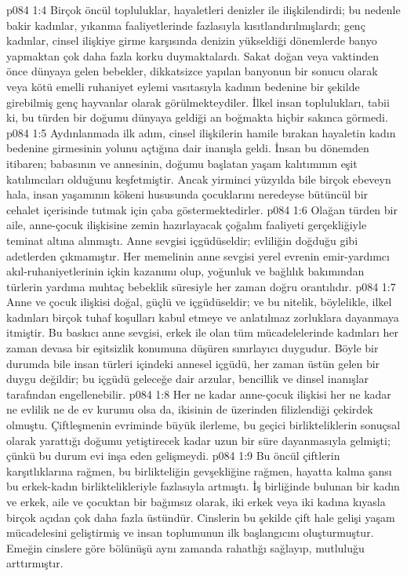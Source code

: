 \vs p084 1:4 Birçok öncül topluluklar, hayaletleri denizler ile ilişkilendirdi; bu nedenle bakir kadınlar, yıkanma faaliyetlerinde fazlasıyla kısıtlandırılmışlardı; genç kadınlar, cinsel ilişkiye girme karşısında denizin yükseldiği dönemlerde banyo yapmaktan çok daha fazla korku duymaktalardı. Sakat doğan veya vaktinden önce dünyaya gelen bebekler, dikkatsizce yapılan banyonun bir sonucu olarak veya kötü emelli ruhaniyet eylemi vasıtasıyla kadının bedenine bir şekilde girebilmiş genç hayvanlar olarak görülmekteydiler. İlkel insan toplulukları, tabii ki, bu türden bir doğumu dünyaya geldiği an boğmakta hiçbir sakınca görmedi.
\vs p084 1:5 Aydınlanmada ilk adım, cinsel ilişkilerin hamile bırakan hayaletin kadın bedenine girmesinin yolunu açtığına dair inanışla geldi. İnsan bu dönemden itibaren; babasının ve annesinin, doğumu başlatan yaşam kalıtımının eşit katılımcıları olduğunu keşfetmiştir. Ancak yirminci yüzyılda bile birçok ebeveyn hala, insan yaşamının kökeni hususunda çocuklarını neredeyse bütüncül bir cehalet içerisinde tutmak için çaba göstermektedirler.
\vs p084 1:6 Olağan türden bir aile, anne\hyp{}çocuk ilişkisine zemin hazırlayacak çoğalım faaliyeti gerçekliğiyle teminat altına alınmıştı. Anne sevgisi içgüdüseldir; evliliğin doğduğu gibi adetlerden çıkmamıştır. Her memelinin anne sevgisi yerel evrenin emir\hyp{}yardımcı akıl\hyp{}ruhaniyetlerinin içkin kazanımı olup, yoğunluk ve bağlılık bakımından türlerin yardıma muhtaç bebeklik süresiyle her zaman doğru orantılıdır.
\vs p084 1:7 Anne ve çocuk ilişkisi doğal, güçlü ve içgüdüseldir; ve bu nitelik, böylelikle, ilkel kadınları birçok tuhaf koşulları kabul etmeye ve anlatılmaz zorluklara dayanmaya itmiştir. Bu baskıcı anne sevgisi, erkek ile olan tüm mücadelelerinde kadınları her zaman devasa bir eşitsizlik konumuna düşüren sınırlayıcı duygudur. Böyle bir durumda bile insan türleri içindeki annesel içgüdü, her zaman üstün gelen bir duygu değildir; bu içgüdü geleceğe dair arzular, bencillik ve dinsel inanışlar tarafından engellenebilir.
\vs p084 1:8 Her ne kadar anne\hyp{}çocuk ilişkisi her ne kadar ne evlilik ne de ev kurumu olsa da, ikisinin de üzerinden filizlendiği çekirdek olmuştu. Çiftleşmenin evriminde büyük ilerleme, bu geçici birlikteliklerin sonuçsal olarak yarattığı doğumu yetiştirecek kadar uzun bir süre dayanmasıyla gelmişti; çünkü bu durum evi inşa eden gelişmeydi.
\vs p084 1:9 Bu öncül çiftlerin karşıtlıklarına rağmen, bu birlikteliğin gevşekliğine rağmen, hayatta kalma şansı bu erkek\hyp{}kadın birliktelikleriyle fazlasıyla artmıştı. İş birliğinde bulunan bir kadın ve erkek, aile ve çocuktan bir bağımsız olarak, iki erkek veya iki kadına kıyasla birçok açıdan çok daha fazla üstündür. Cinslerin bu şekilde çift hale gelişi yaşam mücadelesini geliştirmiş ve insan toplumunun ilk başlangıcını oluşturmuştur. Emeğin cinslere göre bölünüşü aynı zamanda rahatlığı sağlayıp, mutluluğu arttırmıştır.
